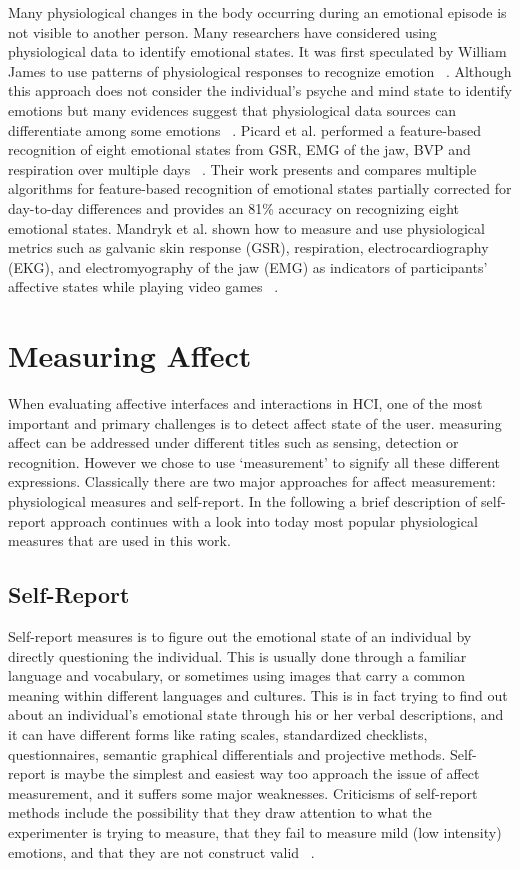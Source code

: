 Many physiological changes in the body occurring during an emotional episode is not visible to another person. Many researchers have considered using physiological data to identify emotional states. It was first speculated by William James to use patterns of physiological responses to recognize emotion ~\cite{cacioppo2000psychophysiology}. Although this approach does not consider the individual's psyche and mind state to identify emotions but many evidences suggest that physiological data sources can differentiate among some emotions ~\cite{ekman1983autonomic}. Picard et al. performed a feature-based recognition of eight emotional states from GSR, EMG of the jaw, BVP and respiration over multiple days ~\cite{picard2001toward}. Their work presents and compares multiple algorithms for feature-based recognition of emotional states partially corrected for day-to-day differences and provides an 81\% accuracy on recognizing eight emotional states. Mandryk et al. shown how to measure and use physiological metrics such as galvanic skin response (GSR), respiration, electrocardiography (EKG), and electromyography of the jaw (EMG) as indicators of participants' affective states while playing video games ~\cite{mandryk2007fuzzy}.

\section{Measuring Affect}
When evaluating affective interfaces and interactions in HCI, one of the most important and primary challenges is to detect affect state of the user. measuring affect can be addressed under different titles such as sensing, detection or recognition. However we chose to use `measurement' to signify all these different expressions. Classically there are two major approaches for affect measurement: physiological measures and self-report. In the following a brief description of self-report approach continues with a look into today most popular physiological measures that are used in this work.

\subsection{Self-Report}
Self-report measures is to figure out the emotional state of an individual by directly questioning the individual. This is usually done through a familiar language and vocabulary, or sometimes using images that carry a common meaning within different languages and cultures. This is in fact trying to find out about an individual's emotional state through his or her verbal descriptions, and it can have different forms like rating scales, standardized checklists, questionnaires, semantic graphical differentials and projective methods. Self-report is maybe the simplest and easiest way too approach the issue of affect measurement, and it suffers some major weaknesses. Criticisms of self-report methods include the possibility that they draw attention to what the experimenter is trying to measure, that they fail to measure mild (low intensity) emotions, and that they are not construct valid ~\cite{isen2007some}.

